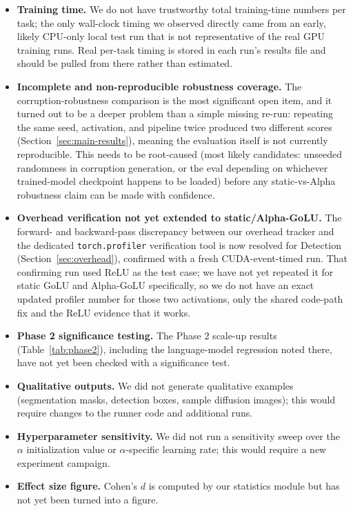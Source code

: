 \documentclass[conference]{IEEEtran}
\begin{document}
\begin{itemize}
\item \textbf{Training time.} We do not have trustworthy total training-time numbers per task; the only wall-clock timing we observed directly came from an early, likely CPU-only local test run that is not representative of the real GPU training runs. Real per-task timing is stored in each run's results file and should be pulled from there rather than estimated.
\item \textbf{Incomplete and non-reproducible robustness coverage.} The corruption-robustness comparison is the most significant open item, and it turned out to be a deeper problem than a simple missing re-run: repeating the same seed, activation, and pipeline twice produced two different scores (Section~\ref{sec:main-results}), meaning the evaluation itself is not currently reproducible. This needs to be root-caused (most likely candidates: unseeded randomness in corruption generation, or the eval depending on whichever trained-model checkpoint happens to be loaded) before any static-vs-Alpha robustness claim can be made with confidence.
\item \textbf{Overhead verification not yet extended to static/Alpha-GoLU.} The forward- and backward-pass discrepancy between our overhead tracker and the dedicated \texttt{torch.profiler} verification tool is now resolved for Detection (Section~\ref{sec:overhead}), confirmed with a fresh CUDA-event-timed run. That confirming run used ReLU as the test case; we have not yet repeated it for static GoLU and Alpha-GoLU specifically, so we do not have an exact updated profiler number for those two activations, only the shared code-path fix and the ReLU evidence that it works.
\item \textbf{Phase 2 significance testing.} The Phase 2 scale-up results (Table~\ref{tab:phase2}), including the language-model regression noted there, have not yet been checked with a significance test.
\item \textbf{Qualitative outputs.} We did not generate qualitative examples (segmentation masks, detection boxes, sample diffusion images); this would require changes to the runner code and additional runs.
\item \textbf{Hyperparameter sensitivity.} We did not run a sensitivity sweep over the $\alpha$ initialization value or $\alpha$-specific learning rate; this would require a new experiment campaign.
\item \textbf{Effect size figure.} Cohen's $d$ is computed by our statistics module but has not yet been turned into a figure.

\end{itemize}
\end{document}
